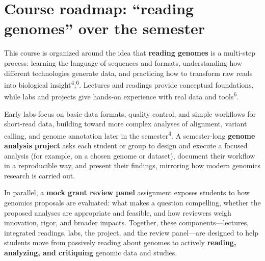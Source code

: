 \documentclass[
  letterpaper,
  DIV=11,
  numbers=noendperiod]{scrreprt}
\begin{document}
\section{Course roadmap: ``reading genomes'' over the
semester}\label{course-roadmap-reading-genomes-over-the-semester}

This course is organized around the idea that \textbf{reading genomes}
is a multi‑step process: learning the language of sequences and formats,
understanding how different technologies generate data, and practicing
how to transform raw reads into biological
insight\textsuperscript{4};\textsuperscript{6}. Lectures and readings
provide conceptual foundations, while labs and projects give hands‑on
experience with real data and tools\textsuperscript{6}.

Early labs focus on basic data formats, quality control, and simple
workflows for short‑read data, building toward more complex analyses of
alignment, variant calling, and genome annotation later in the
semester\textsuperscript{4}. A semester‑long \textbf{genome analysis
project} asks each student or group to design and execute a focused
analysis (for example, on a chosen genome or dataset), document their
workflow in a reproducible way, and present their findings, mirroring
how modern genomics research is carried out.

In parallel, a \textbf{mock grant review panel} assignment exposes
students to how genomics proposals are evaluated: what makes a question
compelling, whether the proposed analyses are appropriate and feasible,
and how reviewers weigh innovation, rigor, and broader impacts.
Together, these components---lectures, integrated readings, labs, the
project, and the review panel---are designed to help students move from
passively reading about genomes to actively \textbf{reading, analyzing,
and critiquing} genomic data and studies.
\end{document}
